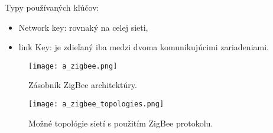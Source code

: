 \documentclass[12pt,a4wide,oneside,openright]{report}
\begin{document}
Typy používaných kľúčov:
\singlespacing
\begin{itemize}
	\item Network key: rovnaký na celej sieti,
	\item link Key: je zdieľaný iba medzi dvoma komunikujúcimi zariadeniami.
\end{itemize}
\onehalfspacing


\begin{figure*}[h]
	\centering
	\texttt{[image: a\_zigbee.png]}
	\caption{Zásobník ZigBee architektúry.
	\cite{gislason2008zigbee}}
	\label{f:o_zigbee_stack}
\end{figure*}

\begin{figure*}[h]
	\centering
	\texttt{[image: a\_zigbee\_topologies.png]}
	\caption{Možné topológie sietí s použitím ZigBee protokolu. \cite{faludi2010building}}
	\label{f:o_zigbee_topology}
\end{figure*}
\end{document}
